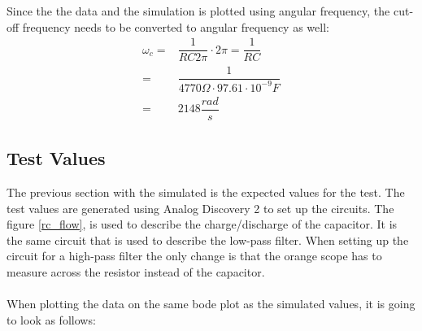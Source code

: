 \noindent Since the the data and the simulation is plotted using angular frequency, the cut-off frequency needs to be converted to angular frequency as well:
\begin{align}
	\omega _c =& \dfrac{1}{RC2\pi} \cdot 2\pi = \dfrac{1}{RC} \nonumber \\
			  =& \dfrac{1}{4770 \Omega \cdot 97.61 \cdot 10^{-9} F} \nonumber \\
			  =& 2148 \dfrac{rad}{s} \label{sim:cut}
\end{align}

\subsection{Test Values}
The previous section with the simulated is the expected values for the test. The test values are generated using Analog Discovery 2 to set up the circuits. The figure \ref{rc_flow}, is used to describe the charge/discharge of the capacitor. It is the same circuit that is used to describe the low-pass filter. When setting up the circuit for a high-pass filter the only change is that the orange scope has to measure across the resistor instead of the capacitor. 
\\ \\ 
When plotting the data on the same bode plot as the simulated values, it is going to look as follows: \\

